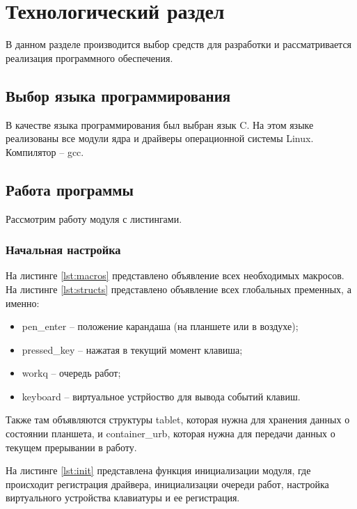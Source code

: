 \chapter{Технологический раздел}
\label{cha:impl}

В данном разделе производится выбор средств для разработки и рассматривается реализация программного обеспечения.

\section{Выбор языка программирования}

В качестве языка программирования был выбран язык C. На этом языке реализованы все модули ядра и драйверы операционной системы Linux. Компилятор -- gcc.

\section{Работа программы}

Рассмотрим работу модуля с листингами.

\subsection{Начальная настройка}

На листинге \ref{lst:macros} представлено объявление всех необходимых макросов. На листинге \ref{lst:structs} представлено объявление всех глобальных пременных, а именно:

\begin{itemize}
    \item pen\_enter -- положение карандаша (на планшете или в воздухе);
    \item pressed\_key -- нажатая в текущий момент клавиша;
    \item workq -- очередь работ;
    \item keyboard -- виртуальное устрйоство для вывода событий клавиш.
\end{itemize}

Также там объявляются структуры tablet, которая нужна для хранения данных о состоянии планшета, и container\_urb, которая нужна для передачи данных о текущем прерывании в работу.

На листинге \ref{lst:init} представлена функция инициализации модуля, где происходит регистрация драйвера, инициализацяи очереди работ, настройка виртуального устройства клавиатуры и ее регистрация.

